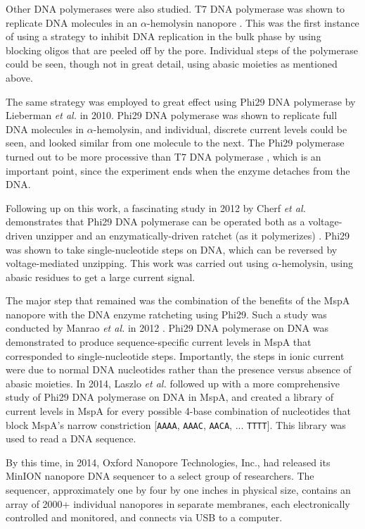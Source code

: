 Other DNA polymerases were also studied.  T7 DNA polymerase was shown to replicate DNA molecules in an $\alpha$-hemolysin nanopore \citep{Olasagasti2010}.  This was the first instance of using a strategy to inhibit DNA replication in the bulk phase by using blocking oligos that are peeled off by the pore.  Individual steps of the polymerase could be seen, though not in great detail, using abasic moieties as mentioned above.

The same strategy was employed to great effect using Phi29 DNA polymerase by Lieberman \textit{et al.} in 2010.  Phi29 DNA polymerase was shown to replicate full DNA molecules in $\alpha$-hemolysin, and individual, discrete current levels could be seen, and looked similar from one molecule to the next.  The Phi29 polymerase turned out to be more processive than T7 DNA polymerase \citep{Lieberman2010}, which is an important point, since the experiment ends when the enzyme detaches from the DNA.

Following up on this work, a fascinating study in 2012 by Cherf \textit{et al.} demonstrates that Phi29 DNA polymerase can be operated both as a voltage-driven unzipper and an enzymatically-driven ratchet (as it polymerizes) \citep{Cherf2012}.  Phi29 was shown to take single-nucleotide steps on DNA, which can be reversed by voltage-mediated unzipping.  This work was carried out using $\alpha$-hemolysin, using abasic residues to get a large current signal.

The major step that remained was the combination of the benefits of the MspA nanopore with the DNA enzyme ratcheting using Phi29.  Such a study was conducted by Manrao \textit{et al.} in 2012 \citep{Manrao2012}.  Phi29 DNA polymerase on DNA was demonstrated to produce sequence-specific current levels in MspA that corresponded to single-nucleotide steps.  Importantly, the steps in ionic current were due to normal DNA nucleotides rather than the presence versus absence of abasic moieties.  In 2014, Laszlo \textit{et al.} \citep{Laszlo2014} followed up with a more comprehensive study of Phi29 DNA polymerase on DNA in MspA, and created a library of current levels in MspA for every possible 4-base combination of nucleotides that block MspA's narrow constriction [\texttt{AAAA}, \texttt{AAAC}, \texttt{AACA}, ... \texttt{TTTT}].  This library was used to read a DNA sequence.

By this time, in 2014, Oxford Nanopore Technologies, Inc., had released its MinION nanopore DNA sequencer to a select group of researchers.  The sequencer, approximately one by four by one inches in physical size, contains an array of 2000+ individual nanopores in separate membranes, each electronically controlled and monitored, and connects via USB to a computer.

